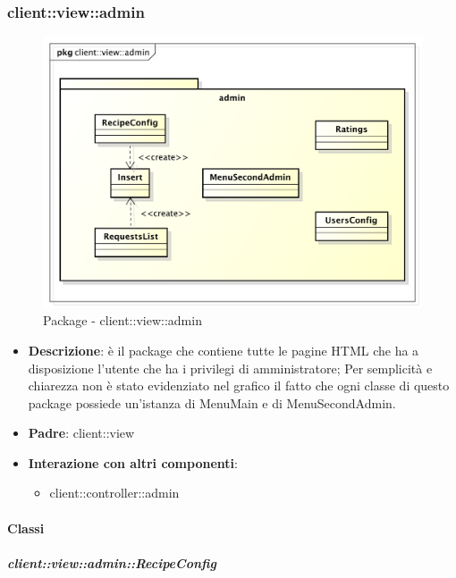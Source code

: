 \subsubsection{client::view::admin} %
\label{ssub:bdsm_app_client_view_admin}
\begin{figure}[htbp]
	\centering
	\centerline{\includegraphics[scale=0.4]{./images/client/client_view_admin.pdf}}
	\caption{Package - client::view::admin}
\end{figure}

\begin{itemize}
	\item \textbf{Descrizione}: è il package che contiene tutte le pagine HTML che ha a disposizione l'utente che ha i privilegi di amministratore;\newline
	Per semplicità e chiarezza non è stato evidenziato nel grafico il fatto che ogni classe di questo package possiede un'istanza di MenuMain e di MenuSecondAdmin.
	\item \textbf{Padre}: client::view
	\item \textbf{Interazione con altri componenti}:
		\begin{itemize}
			\item client::controller::admin
		\end{itemize}
\end{itemize}

	\paragraph{Classi} %
		\subparagraph{client::view::admin::RecipeConfig} %
		\label{subp:bdsm_app_client_view_admin_recipeconfig}

